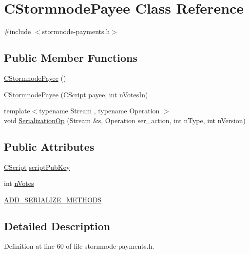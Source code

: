 \hypertarget{class_c_stormnode_payee}{}\section{C\+Stormnode\+Payee Class Reference}
\label{class_c_stormnode_payee}


{\ttfamily \#include $<$stormnode-\/payments.\+h$>$}

\subsection*{Public Member Functions}
\begin{DoxyCompactItemize}
\item 
\hyperlink{class_c_stormnode_payee_a43490998b53ca75320ee68ae1f4e42db}{C\+Stormnode\+Payee} ()
\item 
\hyperlink{class_c_stormnode_payee_a28ad7f02f3c812f25bcaa7902f9bac01}{C\+Stormnode\+Payee} (\hyperlink{class_c_script}{C\+Script} payee, int n\+Votes\+In)
\item 
{\footnotesize template$<$typename Stream , typename Operation $>$ }\\void \hyperlink{class_c_stormnode_payee_a780614332a751cd2be40e81992029707}{Serialization\+Op} (Stream \&s, Operation ser\+\_\+action, int n\+Type, int n\+Version)
\end{DoxyCompactItemize}
\subsection*{Public Attributes}
\begin{DoxyCompactItemize}
\item 
\hyperlink{class_c_script}{C\+Script} \hyperlink{class_c_stormnode_payee_acab0a3c2609700241d04323f1727c870}{script\+Pub\+Key}
\item 
int \hyperlink{class_c_stormnode_payee_a83144ad08e6cd31890029ab304d90f98}{n\+Votes}
\item 
\hyperlink{class_c_stormnode_payee_a6d10db1f8809354d8007e78dd6beef40}{A\+D\+D\+\_\+\+S\+E\+R\+I\+A\+L\+I\+Z\+E\+\_\+\+M\+E\+T\+H\+O\+D\+S}
\end{DoxyCompactItemize}


\subsection{Detailed Description}


Definition at line 60 of file stormnode-\/payments.\+h.



